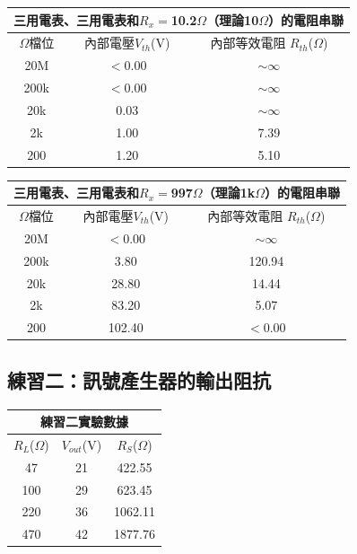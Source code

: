 \documentclass[12pt,a4paper]{article}
\begin{document}
\begin{CJK}{UTF8}{bkai}
\begin{center}
    \begin{tabular}{c|c|c}
    \multicolumn{3}{c}{三用電表、三用電表和$R_{x}=$10.2$\Omega$（理論10$\Omega$）的電阻串聯}\\
    \hline
    \hline
    $\Omega$檔位  &  內部電壓$V_{th}$(V)   &   內部等效電阻
    $R_{th}$($\Omega$)\\
    \hline
    \hline
    20M &   $<$0.00   &   $\sim\infty$\\\hline
    200k    &   $<$0.00    &   $\sim\infty$\\\hline
    20k    &   0.03    &   $\sim\infty$\\\hline
    2k    &   1.00    &   7.39\\\hline
    200    &   1.20    &   5.10\\\hline
    \end{tabular}
\end{center}

\begin{center}
    \begin{tabular}{c|c|c}
    \multicolumn{3}{c}{三用電表、三用電表和$R_{x}=$997$\Omega$（理論1k$\Omega$）的電阻串聯}\\
    \hline
    \hline
    $\Omega$檔位  &  內部電壓$V_{th}$(V)   &   內部等效電阻
    $R_{th}$($\Omega$)\\
    \hline
    \hline
    20M &   $<$0.00    &   $\sim\infty$\\\hline
    200k    &   3.80   &   120.94\\\hline
    20k    &   28.80   &   14.44\\\hline
    2k    &   83.20   &   5.07\\\hline
    200    &   102.40    &   $<$0.00\\\hline
    \end{tabular}
\end{center}

\subsection{練習二：訊號產生器的輸出阻抗}
\hfill

\begin{center}
\begin{tabular}{c|c|c}
    \multicolumn{3}{c}{練習二實驗數據}\\\hline
    $R_{L}$($\Omega$)   &   $V_{out}$(V)    &   $R_{S}$($\Omega$)\\
    \hline\hline
    47  &   21  &   422.55  \\\hline
    100 &   29  &   623.45  \\\hline
    220 &   36  &   1062.11 \\\hline
    470 &   42  &   1877.76 \\\hline
\end{tabular}
\end{center}


\end{CJK}
\end{document}
